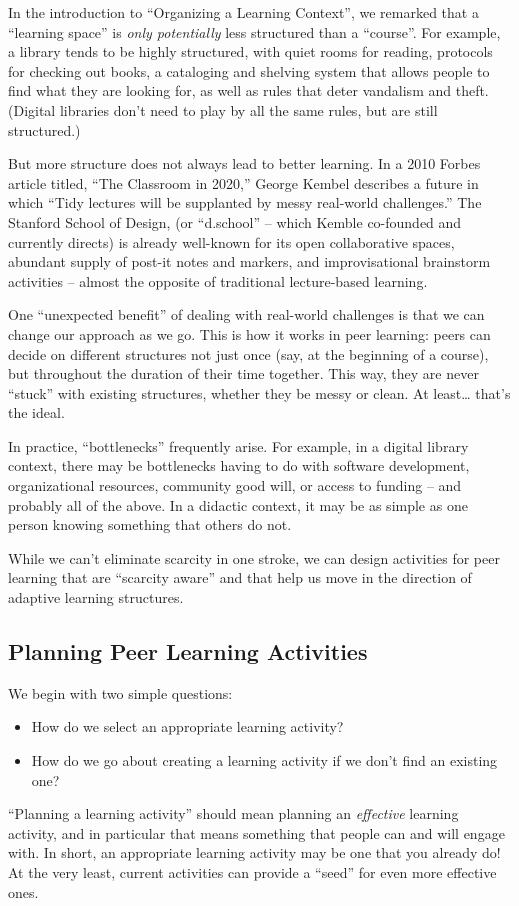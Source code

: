 In the introduction to
``Organizing a Learning Context'', we remarked that a ``learning space'' is
\emph{only potentially} less structured than a ``course''. For example,
a library tends to be highly structured, with quiet rooms for reading,
protocols for checking out books, a cataloging and shelving system that
allows people to find what they are looking for, as well as rules that
deter vandalism and theft. (Digital libraries don't need to play by all
the same rules, but are still structured.)

But more structure does not always lead to better learning. In a 2010
Forbes article titled, ``The Classroom in 2020,'' George Kembel
describes a future in which ``Tidy lectures will be supplanted by messy
real-world challenges.'' The Stanford School of Design, (or ``d.school''
-- which Kemble co-founded and currently directs) is already well-known
for its open collaborative spaces, abundant supply of post-it notes and
markers, and improvisational brainstorm activities -- almost the
opposite of traditional lecture-based learning.

One ``unexpected benefit'' of dealing with real-world challenges is that
we can change our approach as we go. This is how it works in peer
learning: peers can decide on different structures not just once (say,
at the beginning of a course), but throughout the duration of their time
together. This way, they are never ``stuck'' with existing structures,
whether they be messy or clean. At least\ldots{} that's the ideal.

In practice, ``bottlenecks'' frequently arise. For example, in a digital
library context, there may be bottlenecks having to do with software
development, organizational resources, community good will, or access to
funding -- and probably all of the above. In a didactic context, it may
be as simple as one person knowing something that others do not.

While we can't eliminate scarcity in one stroke, we can design
activities for peer learning that are ``scarcity aware'' and that help
us move in the direction of adaptive learning structures.

\subsection{Planning Peer Learning Activities}

We begin with two simple questions:

\begin{itemize}
\item
  How do we select an appropriate learning activity?
\item
  How do we go about creating a learning activity if we don't find an
  existing one?
\end{itemize}
``Planning a learning activity'' should mean planning an
\emph{effective} learning activity, and in particular that means
something that people can and will engage with. In short, an appropriate
learning activity may be one that you already do! At the very least,
current activities can provide a ``seed'' for even more effective ones.

